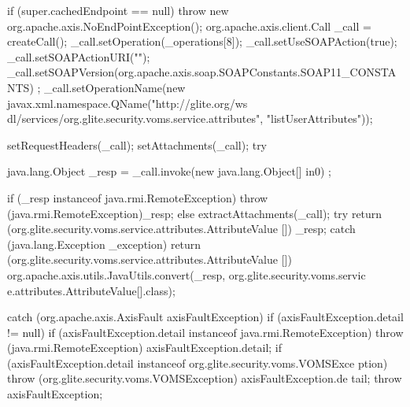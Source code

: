 \begin{DoxyCode}
                                                                                 
                                                                                       
                                       {
        if (super.cachedEndpoint == null) {
            throw new org.apache.axis.NoEndPointException();
        }
        org.apache.axis.client.Call _call = createCall();
        _call.setOperation(_operations[8]);
        _call.setUseSOAPAction(true);
        _call.setSOAPActionURI("");
        _call.setSOAPVersion(org.apache.axis.soap.SOAPConstants.SOAP11_CONSTANTS)
      ;
        _call.setOperationName(new javax.xml.namespace.QName("http://glite.org/ws
      dl/services/org.glite.security.voms.service.attributes", "listUserAttributes"));

        setRequestHeaders(_call);
        setAttachments(_call);
 try {        java.lang.Object _resp = _call.invoke(new java.lang.Object[] {in0})
      ;

        if (_resp instanceof java.rmi.RemoteException) {
            throw (java.rmi.RemoteException)_resp;
        }
        else {
            extractAttachments(_call);
            try {
                return (org.glite.security.voms.service.attributes.AttributeValue
      []) _resp;
            } catch (java.lang.Exception _exception) {
                return (org.glite.security.voms.service.attributes.AttributeValue
      []) org.apache.axis.utils.JavaUtils.convert(_resp, org.glite.security.voms.servic
      e.attributes.AttributeValue[].class);
            }
        }
  } catch (org.apache.axis.AxisFault axisFaultException) {
    if (axisFaultException.detail != null) {
        if (axisFaultException.detail instanceof java.rmi.RemoteException) {
              throw (java.rmi.RemoteException) axisFaultException.detail;
         }
        if (axisFaultException.detail instanceof org.glite.security.voms.VOMSExce
      ption) {
              throw (org.glite.security.voms.VOMSException) axisFaultException.de
      tail;
         }
   }
  throw axisFaultException;
}
    }
\end{DoxyCode}
